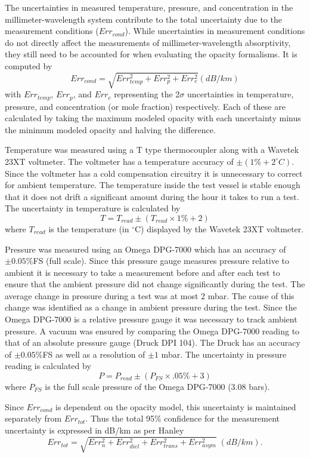 The uncertainties in measured temperature, pressure, and concentration in the millimeter-wavelength system contribute to the total uncertainty due to the measurement conditions ($Err_{cond}$). While uncertainties in measurement conditions do not directly affect the measurements of millimeter-wavelength absorptivity, they still need to be accounted for when evaluating the opacity formalisms. It is computed by
\begin{equation}
Err_{cond} = \sqrt{Err_{temp}^2 + Err_{p}^2 + Err_{c}^2 } (dB/km)
\end{equation}
with $Err_{temp}$, $Err_{p} $, and $ Err_{c}$ representing the 2$\sigma$ uncertainties  in temperature, pressure, and concentration (or mole fraction) respectively. Each of these are calculated by taking the maximum modeled opacity with each uncertainty minus the minimum modeled opacity and halving the difference. 

Temperature was measured using a T type thermocoupler along with a Wavetek 23XT voltmeter. The voltmeter has a temperature accuracy of $\pm (1\% + 2^\circ C)$. Since the voltmeter has a cold compensation circuitry it is unnecessary to correct for ambient temperature. The temperature inside the test vessel is stable enough that it does not drift a significant amount during the hour it takes to run a test. The uncertainty in temperature is calculated by
\begin{equation}
T = T_{read} \pm ( T_{read} \times 1\% + 2)
\end{equation}
where $T_{read}$ is the temperature (in $^\circ$C) displayed by the Wavetek 23XT voltmeter.

Pressure was measured using an Omega DPG-7000 which has an accuracy of $\pm 0.05\%$FS (full scale). Since this pressure gauge measures pressure relative to ambient it is necessary to take a measurement before and after each test to ensure that the ambient pressure did not change significantly during the test. 
The average change in pressure during a test was at most 2 mbar. The cause of this change was identified as a change in ambient pressure during the test. Since the Omega DPG-7000 is a relative pressure gauge it was necessary to track ambient pressure. 
A vacuum was ensured by comparing the Omega DPG-7000 reading to that of an absolute pressure gauge (Druck DPI 104). The Druck has an accuracy of $\pm 0.05\%$FS as well as a resolution of $\pm 1$ mbar. The uncertainty in pressure reading is calculated by
\begin{equation}
P = P_{read} \pm ( P_{FS} \times .05\% + 3)
\end{equation}
where $P_{FS}$ is the full scale pressure of the Omega DPG-7000 (3.08 bars).

Since $Err_{cond}$ is dependent on the opacity model, this uncertainty is maintained separately from $Err_{tot}$. Thus the total 95\% confidence for the measurement uncertainty is expressed in dB/km as per Hanley \cite{Hanley-thesis}
\begin{equation}
Err_{tot} = \sqrt{Err_n^2 + Err_{diel}^2 + Err_{trans}^2 + Err_{asym}^2} \;(dB/km).
\end{equation}
